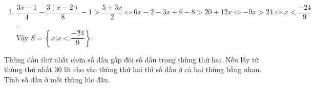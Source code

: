 \begin{ex}
{\begin{enumerate}
\begin{align*}
			&\Leftrightarrow \dfrac{x-10}{9} + \dfrac{x-10}{8} = \dfrac{x-10}{7} + \dfrac{x-10}{6} \Leftrightarrow (x-10)\left(\dfrac{1}{9} + \dfrac{1}{8} - \dfrac{1}{7} - \dfrac{1}{6} \right) = 0\\
			&\Leftrightarrow x-10 = 0 \Leftrightarrow x = 10. 
			\end{align*}
			Vậy $ S = \{10\} $.
			\item $ \dfrac{3x-1}{4} - \dfrac{3(x-2)}{8} -1 > \dfrac{5+3x}{2} \Leftrightarrow 6x-2 - 3x+6 - 8 > 20+12x \Leftrightarrow -9x > 24 \Leftrightarrow x < \dfrac{-24}{9} $.\\
			Vậy $ S = \left\{x|x < \dfrac{-24}{9} \right\}  $.
		\end{enumerate}	
	}
\end{ex}
\begin{ex}%
	Thùng dầu thứ nhất chứa số dầu gấp đôi số dầu trong thùng thứ hai. Nếu lấy từ thùng thứ nhất $ 30 $ lít cho vào thùng thứ hai thì số dầu ở cả hai thùng bằng nhau. Tính số dầu ở mỗi thùng lúc đầu.
\end{ex}
